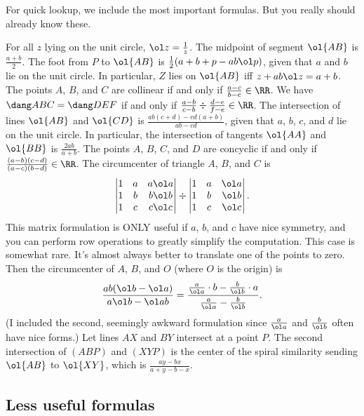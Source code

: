\documentclass[11pt]{scrartcl}
\begin{document}
For quick lookup, we include the most important formulas. But you really should already know these.
\begin{itemize}
	\ii For all $z$ lying on the unit circle, $\ol z = \frac 1z$.
	\ii The midpoint of segment $\ol{AB}$ is $\frac{a + b}2$.
	\ii The foot from $P$ to $\ol{AB}$ is $\frac12(a + b + p - ab\ol p)$, given that $a$ and $b$ lie on the unit circle. In particular, $Z$ lies on $\ol{AB}$ iff $z + ab\ol z = a + b$.
	\ii The points $A$, $B$, and $C$ are collinear if and only if $\frac{a - c}{b - c} \in \RR$.
	\ii We have $\dang ABC = \dang DEF$ if and only if $\frac{a - b}{c - b} \div \frac{d - e}{f - e} \in \RR$.
	\ii The intersection of lines $\ol{AB}$ and $\ol{CD}$ is $\frac{ab(c + d) - cd(a + b)}{ab - cd}$, given that $a$, $b$, $c$, and $d$ lie on the unit circle. In particular, the intersection of tangents $\ol{AA}$ and $\ol{BB}$ is $\frac{2ab}{a + b}$.
	\ii The points $A$, $B$, $C$, and $D$ are concyclic if and only if $\frac{(a - b)(c - d)}{(a - c)(b - d)} \in \RR$.
	\ii The circumcenter of triangle $A$, $B$, and $C$ is
	\[\begin{vmatrix}
		1 & a & a\ol a \\
		1 & b & b\ol b \\
		1 & c & c\ol c
	\end{vmatrix} \div \begin{vmatrix}
		1 & a & \ol a \\
		1 & b & \ol b \\
		1 & c & \ol c
	\end{vmatrix}.\]
	This matrix formulation is ONLY useful if $a$, $b$, and $c$ have nice symmetry, and you can perform row operations to greatly simplify the computation. This case is somewhat rare. It's almost always better to translate one of the points to zero. Then the circumcenter of $A$, $B$, and $O$ (where $O$ is the origin) is
	\[\frac{ab(\ol b - \ol a)}{a\ol b - \ol ab} = \frac{\frac a{\ol a} \cdot b - \frac b{\ol b} \cdot a}{\frac a{\ol a} - \frac b{\ol b}}.\]
	(I included the second, seemingly awkward formulation since $\frac a{\ol a}$ and $\frac b{\ol b}$ often have nice forms.)
	\ii Let lines $AX$ and $BY$ intersect at a point $P$. The second intersection of $(ABP)$ and $(XYP)$ is the center of the spiral similarity sending $\ol{AB}$ to $\ol{XY}$, which is $\frac{ay - bx}{a + y - b - x}$.
\end{itemize}

\subsection{Less useful formulas}
\end{document}

